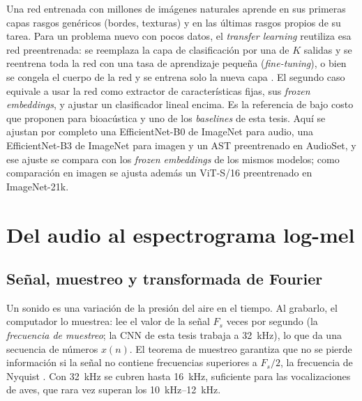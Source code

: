 Una red entrenada con millones de imágenes naturales aprende en sus primeras
capas rasgos genéricos (bordes, texturas) y en las últimas rasgos propios de
su tarea. Para un problema nuevo con pocos datos, el \textit{transfer
learning} reutiliza esa red preentrenada: se reemplaza la capa de
clasificación por una de $K$ salidas y se reentrena toda la red con una tasa
de aprendizaje pequeña (\textit{fine-tuning}), o bien se congela el cuerpo
de la red y se entrena solo la nueva capa
\citep[pp.~189--190]{bishop2024deep}. El segundo caso equivale a usar la red
como extractor de características fijas, sus \textit{frozen embeddings}, y
ajustar un clasificador lineal encima. Es la referencia de bajo costo que
\citet{ghani2023embeddings} proponen para bioacústica y uno de los
\textit{baselines} de esta tesis. Aquí se ajustan por completo una
EfficientNet-B0 de ImageNet para audio, una EfficientNet-B3 de ImageNet para
imagen y un AST preentrenado en AudioSet, y ese ajuste se compara con los
\textit{frozen embeddings} de los mismos modelos; como comparación en imagen
se ajusta además un ViT-S/16 preentrenado en ImageNet-21k.

\section{Del audio al espectrograma log-mel}\label{sec:teoria-audio}

\subsection{Señal, muestreo y transformada de Fourier}

Un sonido es una variación de la presión del aire en el tiempo. Al grabarlo,
el computador lo muestrea: lee el valor de la señal $F_s$ veces por segundo
(la \emph{frecuencia de muestreo}; la CNN de esta tesis trabaja a
\SI{32}{\kilo\hertz}), lo
que da una secuencia de números $x(n)$. El teorema de muestreo garantiza que
no se pierde información si la señal no contiene frecuencias superiores a
$F_s/2$, la frecuencia de Nyquist \citep[pp.~50, 61]{muller2021fmp}. Con
\SI{32}{\kilo\hertz} se cubren hasta \SI{16}{\kilo\hertz}, suficiente para
las vocalizaciones de aves, que rara vez superan los
\SIrange{10}{12}{\kilo\hertz}.

